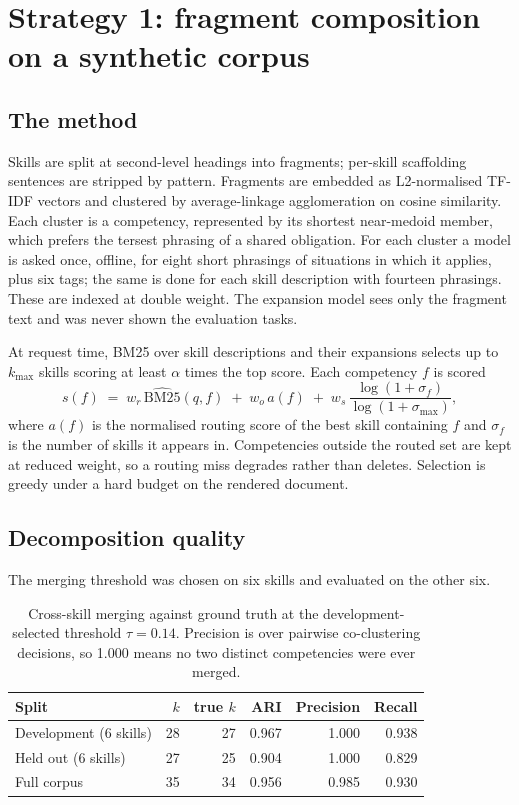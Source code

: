\documentclass[11pt]{article}
\begin{document}
\section{Strategy 1: fragment composition on a synthetic corpus}
\label{sec:s1}

\subsection{The method}

Skills are split at second-level headings into fragments; per-skill scaffolding sentences are
stripped by pattern. Fragments are embedded as L2-normalised TF-IDF vectors and clustered by
average-linkage agglomeration on cosine similarity. Each cluster is a competency, represented by
its shortest near-medoid member, which prefers the tersest phrasing of a shared obligation. For
each cluster a model is asked once, offline, for eight short phrasings of situations in which it
applies, plus six tags; the same is done for each skill description with fourteen phrasings. These
are indexed at double weight. The expansion model sees only the fragment text and was never shown
the evaluation tasks.

At request time, BM25 over skill descriptions and their expansions selects up to $k_{\max}$ skills
scoring at least $\alpha$ times the top score. Each competency $f$ is scored
\[
s(f) \;=\; w_r\,\widehat{\text{BM25}}(q, f) \;+\; w_o\,a(f) \;+\; w_s\,\frac{\log(1 + \sigma_f)}{\log(1 + \sigma_{\max})},
\]
where $a(f)$ is the normalised routing score of the best skill containing $f$ and $\sigma_f$ is the
number of skills it appears in. Competencies outside the routed set are kept at reduced weight, so
a routing miss degrades rather than deletes. Selection is greedy under a hard budget on the rendered
document.

\subsection{Decomposition quality}

The merging threshold was chosen on six skills and evaluated on the other six.

\begin{table}[h]\centering\small
\begin{tabular}{lrrrrr}
\toprule
Split & $k$ & true $k$ & ARI & Precision & Recall \\
\midrule
Development (6 skills) & 28 & 27 & 0.967 & 1.000 & 0.938 \\
Held out (6 skills) & 27 & 25 & 0.904 & 1.000 & 0.829 \\
Full corpus & 35 & 34 & 0.956 & 0.985 & 0.930 \\
\bottomrule
\end{tabular}
\caption{Cross-skill merging against ground truth at the development-selected threshold
$\tau = 0.14$. Precision is over pairwise co-clustering decisions, so 1.000 means no two distinct
competencies were ever merged.}
\label{tab:s1cluster}
\end{table}
\end{document}
